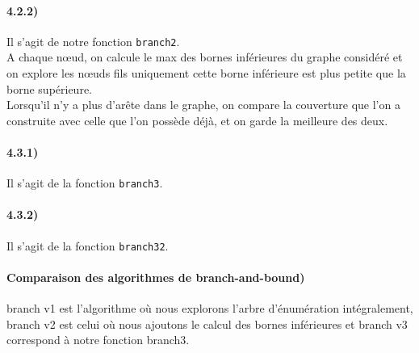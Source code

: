 \documentclass[12pt]{article}
\begin{document}
    \paragraph{4.2.2)}
        Il s'agit de notre fonction \texttt{branch2}. \\
        A chaque nœud, on calcule le max des bornes inférieures du graphe considéré et on explore les nœuds fils uniquement cette borne inférieure est plus petite que la borne supérieure. \\
        Lorsqu'il n'y a plus d'arête dans le graphe, on compare la couverture que l'on a construite avec celle que l'on possède déjà, et on garde la meilleure des deux.
    
    \paragraph{4.3.1)}
        Il s'agit de la fonction \texttt{branch3}.

    \paragraph{4.3.2)}
        Il s'agit de la fonction \texttt{branch32}.

    \paragraph{Comparaison des algorithmes de branch-and-bound)}
        branch v1 est l'algorithme où nous explorons l'arbre d'énumération intégralement, branch v2 est celui où nous ajoutons le calcul des bornes inférieures et branch v3 correspond à notre fonction branch3.
\end{document}
